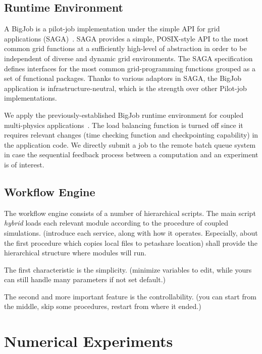 \documentclass[10pt,conference]{IEEEtran}
\begin{document}
\subsection{Runtime Environment}
A BigJob is a pilot-job implementation under the simple API for grid applications (SAGA)~\cite{saga_url}. SAGA provides a simple, POSIX-style API to the most common grid functions at a sufficiently high-level of abstraction in order to be independent of diverse and dynamic grid environments. The SAGA specification defines interfaces for the most common grid-programming functions grouped as a set of functional packages. Thanks to various adaptors in SAGA, the BigJob application is infrastructure-neutral, which is the strength over other
Pilot-job implementations.

We apply the previously-established BigJob runtime environment for coupled multi-physics applications~\cite{CCGrid_Hybrid}. The load balancing function is turned off since it requires relevant changes (time checking function and checkpointing capability) in the application code. We directly submit a job to the remote batch queue system in case the sequential feedback process between a computation and an experiment is of interest.


\subsection{Workflow Engine}
The workflow engine consists of a number of hierarchical scripts. The main script \textit{hybrid} loads each relevant module according to the procedure of coupled simulations. 
(introduce each service, along with how it operates. Especially, about the first procedure which copies local files to petashare location)
shall provide the hierarchical structure where modules will run.


The first characteristic is the simplicity. (minimize variables to edit, while yours can still handle many parameters if not set default.)


The second and more important feature is the controllability. (you can start from the middle, skip some procedures, restart from where it ended.)



\section{Numerical Experiments}
\label{sec:experiment}
\end{document}
